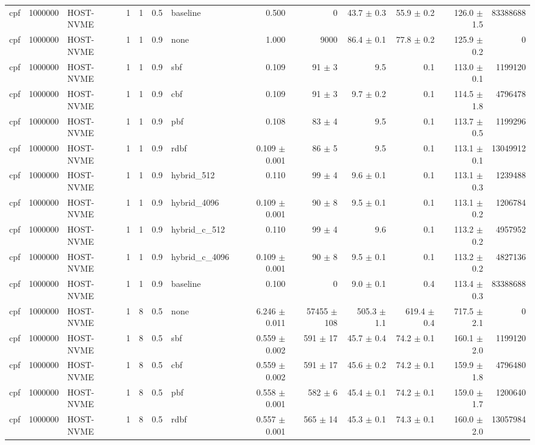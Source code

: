 \begin{tabular}{lllllllrrrrrr}
cpf & 1000000 & HOST-NVME & 1 & 1 & 0.5 & baseline & 0.500 & 0 & 43.7 $\pm$ 0.3 & 55.9 $\pm$ 0.2 & 126.0 $\pm$ 1.5 & 83388688 \\
cpf & 1000000 & HOST-NVME & 1 & 1 & 0.9 & none & 1.000 & 9000 & 86.4 $\pm$ 0.1 & 77.8 $\pm$ 0.2 & 125.9 $\pm$ 0.2 & 0 \\
cpf & 1000000 & HOST-NVME & 1 & 1 & 0.9 & sbf & 0.109 & 91 $\pm$ 3 & 9.5 & 0.1 & 113.0 $\pm$ 0.1 & 1199120 \\
cpf & 1000000 & HOST-NVME & 1 & 1 & 0.9 & cbf & 0.109 & 91 $\pm$ 3 & 9.7 $\pm$ 0.2 & 0.1 & 114.5 $\pm$ 1.8 & 4796478 \\
cpf & 1000000 & HOST-NVME & 1 & 1 & 0.9 & pbf & 0.108 & 83 $\pm$ 4 & 9.5 & 0.1 & 113.7 $\pm$ 0.5 & 1199296 \\
cpf & 1000000 & HOST-NVME & 1 & 1 & 0.9 & rdbf & 0.109 $\pm$ 0.001 & 86 $\pm$ 5 & 9.5 & 0.1 & 113.1 $\pm$ 0.1 & 13049912 \\
cpf & 1000000 & HOST-NVME & 1 & 1 & 0.9 & hybrid\_512 & 0.110 & 99 $\pm$ 4 & 9.6 $\pm$ 0.1 & 0.1 & 113.1 $\pm$ 0.3 & 1239488 \\
cpf & 1000000 & HOST-NVME & 1 & 1 & 0.9 & hybrid\_4096 & 0.109 $\pm$ 0.001 & 90 $\pm$ 8 & 9.5 $\pm$ 0.1 & 0.1 & 113.1 $\pm$ 0.2 & 1206784 \\
cpf & 1000000 & HOST-NVME & 1 & 1 & 0.9 & hybrid\_c\_512 & 0.110 & 99 $\pm$ 4 & 9.6 & 0.1 & 113.2 $\pm$ 0.2 & 4957952 \\
cpf & 1000000 & HOST-NVME & 1 & 1 & 0.9 & hybrid\_c\_4096 & 0.109 $\pm$ 0.001 & 90 $\pm$ 8 & 9.5 $\pm$ 0.1 & 0.1 & 113.2 $\pm$ 0.2 & 4827136 \\
cpf & 1000000 & HOST-NVME & 1 & 1 & 0.9 & baseline & 0.100 & 0 & 9.0 $\pm$ 0.1 & 0.4 & 113.4 $\pm$ 0.3 & 83388688 \\
cpf & 1000000 & HOST-NVME & 1 & 8 & 0.5 & none & 6.246 $\pm$ 0.011 & 57455 $\pm$ 108 & 505.3 $\pm$ 1.1 & 619.4 $\pm$ 0.4 & 717.5 $\pm$ 2.1 & 0 \\
cpf & 1000000 & HOST-NVME & 1 & 8 & 0.5 & sbf & 0.559 $\pm$ 0.002 & 591 $\pm$ 17 & 45.7 $\pm$ 0.4 & 74.2 $\pm$ 0.1 & 160.1 $\pm$ 2.0 & 1199120 \\
cpf & 1000000 & HOST-NVME & 1 & 8 & 0.5 & cbf & 0.559 $\pm$ 0.002 & 591 $\pm$ 17 & 45.6 $\pm$ 0.2 & 74.2 $\pm$ 0.1 & 159.9 $\pm$ 1.8 & 4796480 \\
cpf & 1000000 & HOST-NVME & 1 & 8 & 0.5 & pbf & 0.558 $\pm$ 0.001 & 582 $\pm$ 6 & 45.4 $\pm$ 0.1 & 74.2 $\pm$ 0.1 & 159.0 $\pm$ 1.7 & 1200640 \\
cpf & 1000000 & HOST-NVME & 1 & 8 & 0.5 & rdbf & 0.557 $\pm$ 0.001 & 565 $\pm$ 14 & 45.3 $\pm$ 0.1 & 74.3 $\pm$ 0.1 & 160.0 $\pm$ 2.0 & 13057984 \\

\end{tabular}
